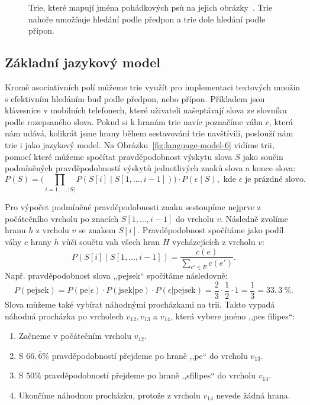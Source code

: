 \documentclass{csbulletin}
\begin{document}
\begin{figure}
\centering

\caption{Trie, které mapují jména pohádkových psů na jejich obrázky~\cite{hannabarbera2023huckleberry, capek1972povidani, gogen2023gogen}. Trie nahoře umožňuje hledání podle předpon a trie dole hledání podle přípon.}
\label{fig:trie}
\bigskip

\end{figure}

\subsection{Základní jazykový model}
Kromě asociativních polí můžeme trie využít pro implementaci textových množin s efektivním hledáním buď podle předpon, nebo přípon. Příkladem jsou klávesnice v mobilních telefonech, které uživateli našeptávají slova ze slovníku podle rozepsaného slova. Pokud si k hranám trie navíc poznačíme váhu $c$, která nám udává, kolikrát jsme hrany během sestavování trie navštívili, poslouží nám trie i jako jazykový model. Na Obrázku~\ref{fig:language-model-6} vidíme trii, pomocí které můžeme spočítat pravděpodobnost výskytu slova $S$ jako součin podmíněných pravděpodobností výskytů jednotlivých znaků slova a konce slova:
\begin{equation}
P(S) = \big(  \!\!\! \!\!\! \prod_{i = 1,\ldots,|S|} \!\!\!\! P(S[i]\mid S[1, \ldots, i-1]) \big)\cdot P(\epsilon\mid S),
\text{ kde $\epsilon$ je prázdné slovo.}
\end{equation}

Pro výpočet podmíněné pravděpodobnosti znaku sestoupíme nejprve z počátečního vrcholu po znacích $S[1, \ldots, i-1]$ do vrcholu $v$. Následně zvolíme hranu $h$ z vrcholu $v$ se znakem $S[i]$. Pravděpodobnost spočítáme jako podíl váhy $c$ hrany $h$ vůči součtu vah všech hran $H$ vycházejících z vrcholu $v$:
\begin{equation}
P(S[i]\mid S[1, \ldots, i-1]) = \frac{c(e)}{\sum_{e'\in E} c(e')}.
\end{equation}
Např. pravděpodobnost slova ,,pejsek`` spočítáme následovně:
\begin{equation}
P(\text{pejsek}) = P(\text{pe}|\epsilon) \cdot P(\text{jsek}|\text{pe}) \cdot P(\epsilon|\text{pejsek}) = \frac23\cdot \frac12\cdot 1 = \frac13 = 33{,}\overline3\ \%.
\end{equation}
Slova můžeme také vybírat náhodnými procházkami na trii. Takto vypadá náhodná procházka po vrcholech $v_{12}, v_{13}$ a $v_{14}$, která vybere jméno ,,pes filipes``:
\begin{enumerate}
\item Začneme v počátečním vrcholu $v_{12}$.
\item S $66{,}\overline6\%$ pravděpodobností přejdeme po hraně ,,pe`` do vrcholu $v_{13}$.
\item S $50\%$ pravděpodobností přejdeme po hraně ,,s\textvisiblespace filipes`` do vrcholu $v_{14}$.
\item Ukončíme náhodnou procházku, protože z vrcholu $v_{14}$ nevede žádná hrana.
\end{enumerate}
\end{document}

